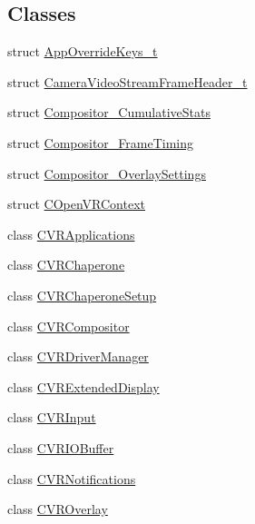 \subsection*{Classes}
\begin{DoxyCompactItemize}
\item 
struct \mbox{\hyperlink{struct_valve_1_1_v_r_1_1_app_override_keys__t}{App\+Override\+Keys\+\_\+t}}
\item 
struct \mbox{\hyperlink{struct_valve_1_1_v_r_1_1_camera_video_stream_frame_header__t}{Camera\+Video\+Stream\+Frame\+Header\+\_\+t}}
\item 
struct \mbox{\hyperlink{struct_valve_1_1_v_r_1_1_compositor___cumulative_stats}{Compositor\+\_\+\+Cumulative\+Stats}}
\item 
struct \mbox{\hyperlink{struct_valve_1_1_v_r_1_1_compositor___frame_timing}{Compositor\+\_\+\+Frame\+Timing}}
\item 
struct \mbox{\hyperlink{struct_valve_1_1_v_r_1_1_compositor___overlay_settings}{Compositor\+\_\+\+Overlay\+Settings}}
\item 
struct \mbox{\hyperlink{struct_valve_1_1_v_r_1_1_c_open_v_r_context}{C\+Open\+V\+R\+Context}}
\item 
class \mbox{\hyperlink{class_valve_1_1_v_r_1_1_c_v_r_applications}{C\+V\+R\+Applications}}
\item 
class \mbox{\hyperlink{class_valve_1_1_v_r_1_1_c_v_r_chaperone}{C\+V\+R\+Chaperone}}
\item 
class \mbox{\hyperlink{class_valve_1_1_v_r_1_1_c_v_r_chaperone_setup}{C\+V\+R\+Chaperone\+Setup}}
\item 
class \mbox{\hyperlink{class_valve_1_1_v_r_1_1_c_v_r_compositor}{C\+V\+R\+Compositor}}
\item 
class \mbox{\hyperlink{class_valve_1_1_v_r_1_1_c_v_r_driver_manager}{C\+V\+R\+Driver\+Manager}}
\item 
class \mbox{\hyperlink{class_valve_1_1_v_r_1_1_c_v_r_extended_display}{C\+V\+R\+Extended\+Display}}
\item 
class \mbox{\hyperlink{class_valve_1_1_v_r_1_1_c_v_r_input}{C\+V\+R\+Input}}
\item 
class \mbox{\hyperlink{class_valve_1_1_v_r_1_1_c_v_r_i_o_buffer}{C\+V\+R\+I\+O\+Buffer}}
\item 
class \mbox{\hyperlink{class_valve_1_1_v_r_1_1_c_v_r_notifications}{C\+V\+R\+Notifications}}
\item 
class \mbox{\hyperlink{class_valve_1_1_v_r_1_1_c_v_r_overlay}{C\+V\+R\+Overlay}}
\item 

\end{DoxyCompactItemize}
